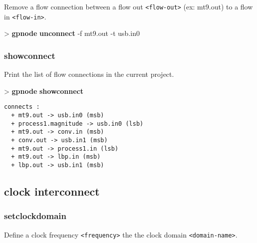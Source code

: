 \documentclass[10pt,a4paper]{article}
\begin{document}
Remove a flow connection between a flow out \texttt{<flow-out>} (ex: mt9.out) to a flow in \texttt{<flow-in>}.


\begin{sampletitle}
> \textbf{gpnode} \textbf{unconnect} -f mt9.out -t usb.in0
\end{sampletitle}


\subsubsection{showconnect}

Print the list of flow connections in the current project.

\begin{sampletitle}
> \textbf{gpnode} \textbf{showconnect}
\begin{Verbatim}
connects :
  + mt9.out -> usb.in0 (msb)
  + process1.magnitude -> usb.in0 (lsb)
  + mt9.out -> conv.in (msb)
  + conv.out -> usb.in1 (msb)
  + mt9.out -> process1.in (lsb)
  + mt9.out -> lbp.in (msb)
  + lbp.out -> usb.in1 (msb)
\end{Verbatim}
\end{sampletitle}


\subsection{clock interconnect}
\subsubsection{setclockdomain}

Define a clock frequency \texttt{<frequency>} the the clock domain \texttt{<domain-name>}.

\end{document}
